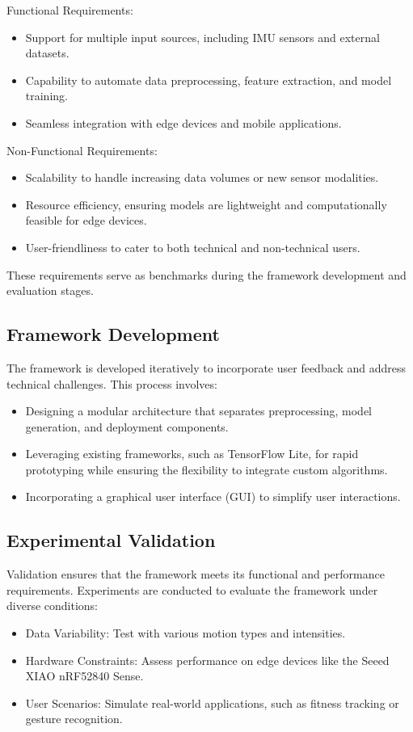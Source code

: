 Functional Requirements:
\begin{itemize}
    \item Support for multiple input sources, including IMU sensors and external datasets.
    \item Capability to automate data preprocessing, feature extraction, and model training.
    \item Seamless integration with edge devices and mobile applications.
\end{itemize}
Non-Functional Requirements:
\begin{itemize}
    \item Scalability to handle increasing data volumes or new sensor modalities.
    \item Resource efficiency, ensuring models are lightweight and computationally feasible for edge devices.
    \item User-friendliness to cater to both technical and non-technical users.
\end{itemize}
These requirements serve as benchmarks during the framework development and evaluation stages.

\subsection{Framework Development}
The framework is developed iteratively to incorporate user feedback and address technical challenges. This process involves:

\begin{itemize}
    \item Designing a modular architecture that separates preprocessing, model generation, and deployment components.
    \item Leveraging existing frameworks, such as TensorFlow Lite, for rapid prototyping while ensuring the flexibility to integrate custom algorithms.
    \item Incorporating a graphical user interface (GUI) to simplify user interactions.
\end{itemize}

\subsection{Experimental Validation}
Validation ensures that the framework meets its functional and performance requirements. Experiments are conducted to evaluate the framework under diverse conditions:

\begin{itemize}
    \item Data Variability: Test with various motion types and intensities.
    \item Hardware Constraints: Assess performance on edge devices like the Seeed XIAO nRF52840 Sense.
    \item User Scenarios: Simulate real-world applications, such as fitness tracking or gesture recognition.
\end{itemize}
